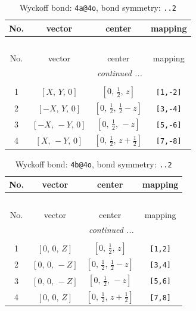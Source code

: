 \documentclass[fleqn,8pt]{jsarticle}
\begin{document}
\begin{longtable}{cccc}
\caption{Wyckoff bond: {\tt 4a@4o}, bond symmetry: {\tt ..2}}
 \\
 \hline \hline
No. & vector & center & mapping \\ \hline \endfirsthead

\multicolumn{3}{l}{\tablename\ \thetable{}} \\
 \hline \hline
No. & vector & center & mapping \\ \hline \endhead

 \hline \hline
\multicolumn{3}{r}{\footnotesize\it continued ...} \\ \endfoot

 \hline \hline
\multicolumn{3}{r}{} \\ \endlastfoot

1 & $\left[ X,\, Y,\, 0 \right]$ & $\left[ 0,\, \frac{1}{2},\, z \right]$ & {\tt [1,-2]} \\ \hline
2 & $\left[ - X,\, Y,\, 0 \right]$ & $\left[ 0,\, \frac{1}{2},\, \frac{1}{2} - z \right]$ & {\tt [3,-4]} \\ \hline
3 & $\left[ - X,\, - Y,\, 0 \right]$ & $\left[ 0,\, \frac{1}{2},\, - z \right]$ & {\tt [5,-6]} \\ \hline
4 & $\left[ X,\, - Y,\, 0 \right]$ & $\left[ 0,\, \frac{1}{2},\, z + \frac{1}{2} \right]$ & {\tt [7,-8]} \\
\end{longtable}
\renewcommand{\arraystretch}{1.2}
\begin{longtable}{cccc}
\caption{Wyckoff bond: {\tt 4b@4o}, bond symmetry: {\tt ..2}}
 \\
 \hline \hline
No. & vector & center & mapping \\ \hline \endfirsthead

\multicolumn{3}{l}{\tablename\ \thetable{}} \\
 \hline \hline
No. & vector & center & mapping \\ \hline \endhead

 \hline \hline
\multicolumn{3}{r}{\footnotesize\it continued ...} \\ \endfoot

 \hline \hline
\multicolumn{3}{r}{} \\ \endlastfoot

1 & $\left[ 0,\, 0,\, Z \right]$ & $\left[ 0,\, \frac{1}{2},\, z \right]$ & {\tt [1,2]} \\ \hline
2 & $\left[ 0,\, 0,\, - Z \right]$ & $\left[ 0,\, \frac{1}{2},\, \frac{1}{2} - z \right]$ & {\tt [3,4]} \\ \hline
3 & $\left[ 0,\, 0,\, - Z \right]$ & $\left[ 0,\, \frac{1}{2},\, - z \right]$ & {\tt [5,6]} \\ \hline
4 & $\left[ 0,\, 0,\, Z \right]$ & $\left[ 0,\, \frac{1}{2},\, z + \frac{1}{2} \right]$ & {\tt [7,8]} \\
\end{longtable}
\end{document}
